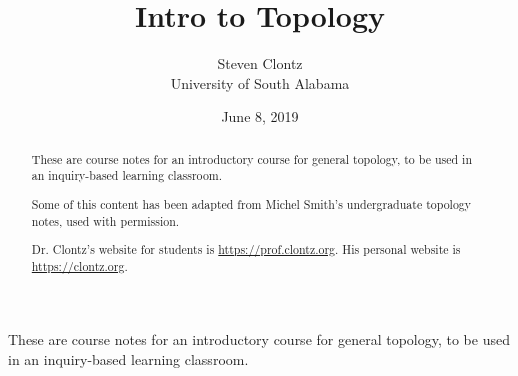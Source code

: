 \documentclass[oneside,10pt,]{article}
\title{Intro to Topology}
\author{Steven Clontz\\
University of South Alabama
}
\date{June 8, 2019}
\begin{document}
\hypertarget{article-4}{}
\maketitle
\thispagestyle{empty}
\begin{abstract}
\hypertarget{p-14}{}%
These are course notes for an introductory course for general topology, to be used in an inquiry-based learning classroom.%
\par
\hypertarget{p-15}{}%
Some of this content has been adapted from Michel Smith's undergraduate topology notes, used with permission.%
\par
\hypertarget{p-16}{}%
Dr. Clontz's website for students is \url{https://prof.clontz.org}. His personal website is \url{https://clontz.org}.%
\end{abstract}
\begin{introduction}{}%
\hypertarget{p-20}{}%
These are course notes for an introductory course for general topology, to be used in an inquiry-based learning classroom.%
\end{introduction}%
%
%
\typeout{************************************************}
\typeout{************************************************}
%
\end{document}
